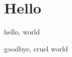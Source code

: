 \sloppy
\raggedbottom

\frontmatter

\tableofcontents*

\mainmatter

\chapter{Hello}

hello, world

%
%
%
%
%
%
%
%
%
%
%

goodbye, cruel world

